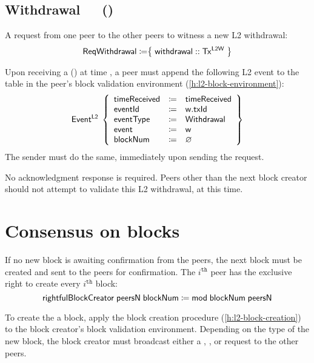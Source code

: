 \documentclass[../hydrozoa.tex]{subfiles}
\begin{document}
\subsection{Withdrawal~~~()}%
\label{h:l2-consensus-withdrawal}%

A request from one peer to the other peers to witness a new L2 withdrawal:
\begin{equation*}
  \mathsf{ReqWithdrawal} \coloneq \bigr\{\; \mathsf{withdrawal} :: \mathsf{Tx^{L2W}} \;\bigr\}
\end{equation*}

Upon receiving a () at time , a peer must append the following L2 event to the  table in the peer's block validation environment (\cref{h:l2-block-environment}):
\begin{equation*}
  \mathsf{Event^{L2}}\;\left\{
  \begin{array}{lll}
    \mathsf{timeReceived} &\coloneq& \mathsf{timeReceived} \\
    \mathsf{eventId} &\coloneq& \mathsf{w.txId} \\
    \mathsf{eventType} &\coloneq& \mathsf{Withdrawal} \\
    \mathsf{event} &\coloneq& \mathsf{w} \\
    \mathsf{blockNum} &\coloneq& \varnothing
  \end{array}\right\}
\end{equation*}
The sender must do the same, immediately upon sending the request.

No acknowledgment response is required.
Peers other than the next block creator should not attempt to validate this L2 withdrawal, at this time.

\section{Consensus on blocks}%
\label{h:l2-consensus-on-blocks}%

If no new block is awaiting confirmation from the peers, the next block must be created and sent to the peers for confirmation.
The $i^\mathtt{th}$ peer has the exclusive right to create every $i^\mathtt{th}$ block: 
\begin{equation*}
  \mathsf{rightfulBlockCreator} \; \mathsf{peersN} \; \mathsf{blockNum} \coloneq
    \mathsf{mod} \; \mathsf{blockNum} \; \mathsf{peersN}
\end{equation*}

To create the a block, apply the block creation procedure (\cref{h:l2-block-creation}) to the block creator's block validation environment.
Depending on the type of the new block, the block creator must broadcast either a , , or  request to the other peers.
\end{document}
